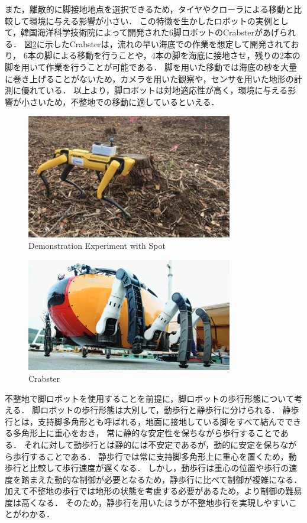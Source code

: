 また，離散的に脚接地地点を選択できるため，タイヤやクローラによる移動と比較して環境に与える影響が小さい．
この特徴を生かしたロボットの実例として，韓国海洋科学技術院によって開発された6脚ロボットのCrabster\cite{J_Kim_Dexterous_Crabster}があげられる．
図\ref{fig:crabster}に示したCrabsterは，流れの早い海底での作業を想定して開発されており，
6本の脚による移動を行うことや，4本の脚を海底に接地させ，残りの2本の脚を用いて作業を行うことが可能である．
脚を用いた移動では海底の砂を大量に巻き上げることがないため\cite{J_Kim_Little_Crabster}，カメラを用いた観察や，センサを用いた地形の計測に優れている．
以上より，脚ロボットは対地適応性が高く，環境に与える影響が小さいため，不整地での移動に適しているといえる．

\begin{figure}[htbp]
  \begin{center}
    \includegraphics[width=90mm, clip]{figure/chapter1/NEDO.png}
    \caption{Demonstration Experiment with Spot}
    \label{fig:nedo_spot} %
  \end{center}
\end{figure}

\begin{figure}[htbp]
  \begin{center}
    \includegraphics[width=90mm, clip]{figure/chapter1/crabster.png}
    \caption{Crabster}
    \label{fig:crabster} %
  \end{center}
\end{figure}

不整地で脚ロボットを使用することを前提に，脚ロボットの歩行形態について考える．
脚ロボットの歩行形態は大別して，動歩行と静歩行に分けられる．
静歩行とは，支持脚多角形とも呼ばれる，地面に接地している脚をすべて結んでできる多角形上に重心をおき，
常に静的な安定性を保ちながら歩行することである．
それに対して動歩行とは静的には不安定であるが，動的に安定を保ちながら歩行することである．
静歩行では常に支持脚多角形上に重心を置くため，動歩行と比較して歩行速度が遅くなる．
しかし，動歩行は重心の位置や歩行の速度を踏まえた動的な制御が必要となるため，静歩行に比べて制御が複雑になる．
加えて不整地の歩行では地形の状態を考慮する必要があるため，より制御の難易度は高くなる．
そのため，静歩行を用いたほうが不整地歩行を実現しやすいことがわかる．

